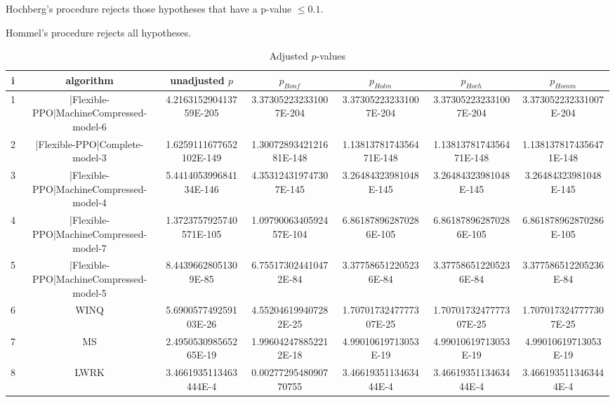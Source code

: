 \documentclass[a3paper,10pt]{article}
\begin{document}
Hochberg's procedure rejects those hypotheses that have a p-value $\le0.1$.


Hommel's procedure rejects all hypotheses.


\begin{table}[!htp]
\centering\tiny
\caption{Adjusted $p$-values}
\begin{tabular}{ccccccc}
i&algorithm&unadjusted $p$&$p_{Bonf}$&$p_{Holm}$&$p_{Hoch}$&$p_{Homm}$\\
\hline
1&|Flexible-PPO|MachineCompressed-model-6&4.216315290413759E-205&3.373052232331007E-204&3.373052232331007E-204&3.373052232331007E-204&3.373052232331007E-204\\
2&|Flexible-PPO|Complete-model-3&1.6259111677652102E-149&1.3007289342121681E-148&1.1381378174356471E-148&1.1381378174356471E-148&1.1381378174356471E-148\\
3&|Flexible-PPO|MachineCompressed-model-4&5.441405399684134E-146&4.353124319747307E-145&3.26484323981048E-145&3.26484323981048E-145&3.26484323981048E-145\\
4&|Flexible-PPO|MachineCompressed-model-7&1.3723757925740571E-105&1.0979006340592457E-104&6.861878962870286E-105&6.861878962870286E-105&6.861878962870286E-105\\
5&|Flexible-PPO|MachineCompressed-model-5&8.44396628051309E-85&6.755173024410472E-84&3.377586512205236E-84&3.377586512205236E-84&3.377586512205236E-84\\
6&WINQ&5.690057749259103E-26&4.552046199407282E-25&1.7070173247777307E-25&1.7070173247777307E-25&1.7070173247777307E-25\\
7&MS&2.495053098565265E-19&1.996042478852212E-18&4.99010619713053E-19&4.99010619713053E-19&4.99010619713053E-19\\
8&LWRK&3.4661935113463444E-4&0.0027729548090770755&3.4661935113463444E-4&3.4661935113463444E-4&3.4661935113463444E-4\\
\hline
\end{tabular}
\end{table}
\end{document}
